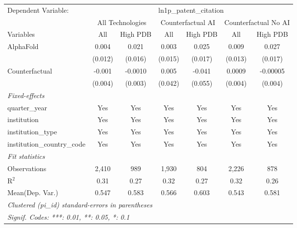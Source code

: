 \begingroup
\centering
\begin{tabular}{lcccccc}
   \tabularnewline \midrule \midrule
   Dependent Variable: & \multicolumn{6}{c}{ln1p\_patent\_citation}\\
 & \multicolumn{2}{c}{All Technologies} & \multicolumn{2}{c}{Counterfactual AI} & \multicolumn{2}{c}{Counterfactual No AI} \\
\cmidrule(lr){1-1}\cmidrule(lr){2-3} \cmidrule(lr){4-5} \cmidrule(lr){6-7}
Variables & \multicolumn{1}{c}{All} & \multicolumn{1}{c}{High PDB} & \multicolumn{1}{c}{All} & \multicolumn{1}{c}{High PDB} & \multicolumn{1}{c}{All} & \multicolumn{1}{c}{High PDB} \\
\cmidrule(lr){1-1}\cmidrule(lr){2-2} \cmidrule(lr){3-3} \cmidrule(lr){4-4} \cmidrule(lr){5-5} \cmidrule(lr){6-6} \cmidrule(lr){7-7}
   AlphaFold                    & 0.004   & 0.021   & 0.003   & 0.025   & 0.009   & 0.027\\   
                                & (0.012) & (0.016) & (0.015) & (0.017) & (0.013) & (0.017)\\   
   Counterfactual               & -0.001  & -0.0010 & 0.005   & -0.041  & 0.0009  & -0.00005\\   
                                & (0.004) & (0.003) & (0.042) & (0.055) & (0.004) & (0.004)\\   
   \midrule
   \emph{Fixed-effects}\\
   quarter\_year                & Yes     & Yes     & Yes     & Yes     & Yes     & Yes\\  
   institution                  & Yes     & Yes     & Yes     & Yes     & Yes     & Yes\\  
   institution\_type            & Yes     & Yes     & Yes     & Yes     & Yes     & Yes\\  
   institution\_country\_code   & Yes     & Yes     & Yes     & Yes     & Yes     & Yes\\  
   \midrule
   \emph{Fit statistics}\\
   Observations                 & 2,410   & 989     & 1,930   & 804     & 2,226   & 878\\  
   R$^2$                        & 0.31    & 0.27    & 0.32    & 0.27    & 0.32    & 0.26\\  
Mean(Dep. Var.) & 0.547 & 0.583 & 0.566 & 0.603 & 0.543 & 0.581 \\
   \midrule \midrule
   \multicolumn{7}{l}{\emph{Clustered (pi\_id) standard-errors in parentheses}}\\
   \multicolumn{7}{l}{\emph{Signif. Codes: ***: 0.01, **: 0.05, *: 0.1}}\\
\end{tabular}
\par\endgroup
